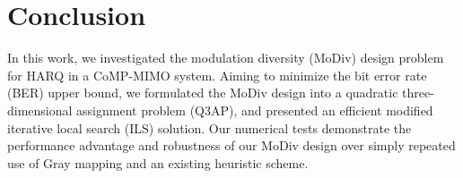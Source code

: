 \documentclass[journal,draftcls,onecolumn,12pt,twoside]{IEEEtran}
\begin{document}
\section{Conclusion}
\label{sec:conclusion}
In this work, we investigated the modulation diversity (MoDiv) design problem
for HARQ in a CoMP-MIMO system. Aiming to minimize the bit error rate (BER)
upper bound, we formulated the MoDiv design into a quadratic three-dimensional
assignment problem (Q3AP), and presented an efficient modified iterative local
search (ILS) solution. Our numerical tests demonstrate the performance advantage
and robustness of our MoDiv design over simply repeated use of Gray mapping
and an existing heuristic scheme.
%
%



%
%
\end{document}
